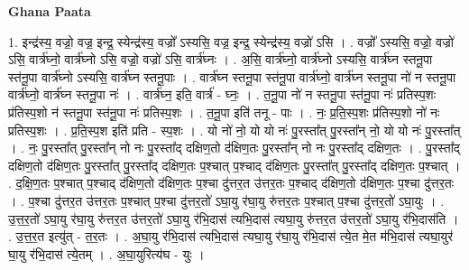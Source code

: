 \documentclass[17pt]{extarticle}
\begin{document}
\textbf{Ghana Paata } \newline

1. इन्द्र॑स्य॒ वज्रो॒ वज्र॒ इन्द्र॒ स्येन्द्र॑स्य॒ वज्रो᳚ ऽस्यसि॒ वज्र॒ इन्द्र॒ स्येन्द्र॑स्य॒ वज्रो॑ ऽसि । . वज्रो᳚ ऽस्यसि॒ वज्रो॒ वज्रो॑ ऽसि॒ वार्त्र॑घ्नो॒ वार्त्र॑घ्नो ऽसि॒ वज्रो॒ वज्रो॑ ऽसि॒ वार्त्र॑घ्नः । . अ॒सि॒ वार्त्र॑घ्नो॒ वार्त्र॑घ्नो ऽस्यसि॒ वार्त्र॑घ्न स्तनू॒पा स्त॑नू॒पा वार्त्र॑घ्नो ऽस्यसि॒ वार्त्र॑घ्न स्तनू॒पाः । . वार्त्र॑घ्न स्तनू॒पा स्त॑नू॒पा वार्त्र॑घ्नो॒ वार्त्र॑घ्न स्तनू॒पा नो॑ न स्तनू॒पा वार्त्र॑घ्नो॒ वार्त्र॑घ्न स्तनू॒पा नः॑ । . वार्त्र॑घ्न॒ इति॒ वार्त्र॑ - घ्नः॒ । . त॒नू॒पा नो॑ न स्तनू॒पा स्त॑नू॒पा नः॑ प्रतिस्प॒शः प्र॑तिस्प॒शो न॑ स्तनू॒पा स्त॑नू॒पा नः॑ प्रतिस्प॒शः । . त॒नू॒पा इति॑ तनू - पाः । . नः॒ प्र॒ति॒स्प॒शः प्र॑तिस्प॒शो नो॑ नः प्रतिस्प॒शः । . प्र॒ति॒स्प॒श इति॑ प्रति - स्प॒शः । . यो नो॑ नो॒ यो यो नः॑ पु॒रस्ता᳚त् पु॒रस्ता᳚न् नो॒ यो यो नः॑ पु॒रस्ता᳚त् । . नः॒ पु॒रस्ता᳚त् पु॒रस्ता᳚न् नो नः पु॒रस्ता᳚द् दक्षिण॒तो द॑क्षिण॒तः पु॒रस्ता᳚न् नो नः पु॒रस्ता᳚द् दक्षिण॒तः । . पु॒रस्ता᳚द् दक्षिण॒तो द॑क्षिण॒तः पु॒रस्ता᳚त् पु॒रस्ता᳚द् दक्षिण॒तः प॒श्चात् प॒श्चाद् द॑क्षिण॒तः पु॒रस्ता᳚त् पु॒रस्ता᳚द् दक्षिण॒तः प॒श्चात् । . द॒क्षि॒ण॒तः प॒श्चात् प॒श्चाद् द॑क्षिण॒तो द॑क्षिण॒तः प॒श्चा दु॑त्तर॒त उ॑त्तर॒तः प॒श्चाद् द॑क्षिण॒तो द॑क्षिण॒तः प॒श्चा दु॑त्तर॒तः । . प॒श्चा दु॑त्तर॒त उ॑त्तर॒तः प॒श्चात् प॒श्चा दु॑त्तर॒तो॑ ऽघा॒यु र॑घा॒यु रु॑त्तर॒तः प॒श्चात् प॒श्चा दु॑त्तर॒तो॑ ऽघा॒युः । . उ॒त्त॒र॒तो॑ ऽघा॒यु र॑घा॒यु रु॑त्तर॒त उ॑त्तर॒तो॑ ऽघा॒यु र॑भि॒दास॑ त्यभि॒दास॑ त्यघा॒यु रु॑त्तर॒त उ॑त्तर॒तो॑ ऽघा॒यु र॑भि॒दास॑ति । . उ॒त्त॒र॒त इत्यु॑त् - त॒र॒तः । . अ॒घा॒यु र॑भि॒दास॑ त्यभि॒दास॑ त्यघा॒यु र॑घा॒यु र॑भि॒दास॑ त्ये॒त मे॒त म॑भि॒दास॑ त्यघा॒युर॑ घा॒यु र॑भि॒दास॑ त्ये॒तम् । . अ॒घा॒युरित्य॑घ - युः । \newline
\end{document}
